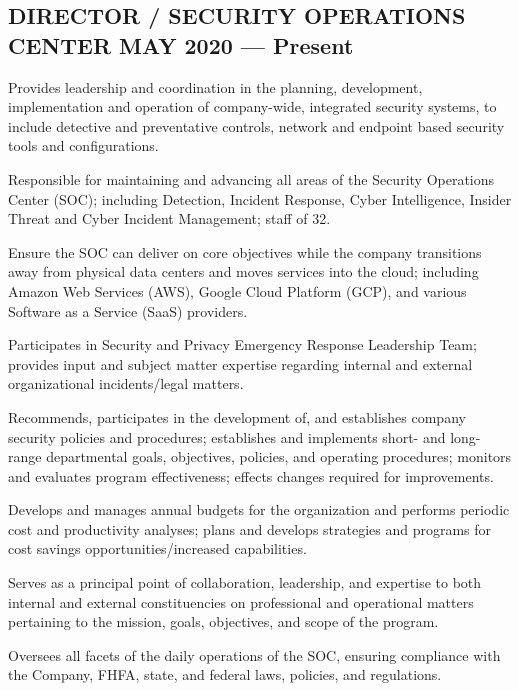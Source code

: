 \documentclass[letter,10pt]{article}
\begin{document}
\subsection{{DIRECTOR / SECURITY OPERATIONS CENTER \hfill MAY 2020 --- Present}}
\begin{zitemize}
 \item Provides leadership and coordination in the planning, development, implementation and operation of company-wide, integrated security systems, to include detective and preventative controls, network and endpoint based security tools and configurations.
\item Responsible for maintaining and advancing all areas of the Security Operations Center (SOC); including Detection, Incident Response, Cyber Intelligence, Insider Threat and Cyber Incident Management; staff of 32.
\item Ensure the SOC can deliver on core objectives while the company transitions away from physical data centers and moves services into the cloud; including Amazon Web Services (AWS), Google Cloud Platform (GCP), and various Software as a Service (SaaS) providers.
\item Participates in Security and Privacy Emergency Response Leadership Team; provides input and subject matter expertise regarding internal and external organizational incidents/legal matters.
\item Recommends, participates in the development of, and establishes company security policies and procedures; establishes and implements short- and long-range departmental goals, objectives, policies, and operating procedures; monitors and evaluates program effectiveness; effects changes required for improvements.
\item Develops and manages annual budgets for the organization and performs periodic cost and productivity analyses; plans and develops strategies and programs for cost savings opportunities/increased capabilities.
\item Serves as a principal point of collaboration, leadership, and expertise to both internal and external constituencies on professional and operational matters pertaining to the mission, goals, objectives, and scope of the program.
\item Oversees all facets of the daily operations of the SOC, ensuring compliance with the Company, FHFA, state, and federal laws, policies, and regulations.
\end{zitemize}
\end{document}
